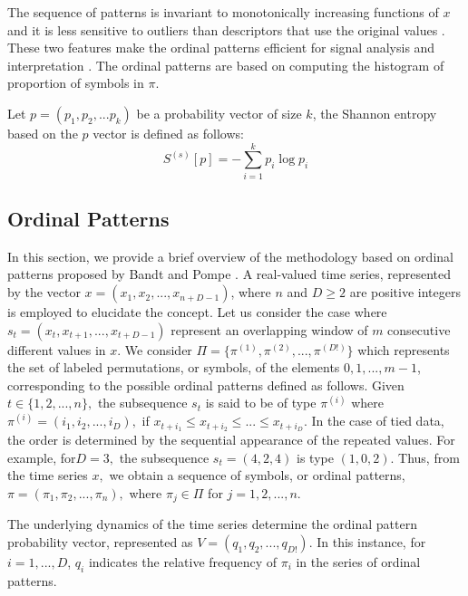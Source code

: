 \documentclass[sn-basic,pdflatex]{sn-jnl}
\theoremstyle{remark}
\theoremstyle{definition}
\begin{document}
The sequence of patterns is invariant to monotonically increasing
functions of \textbf{\(x\)} and it is less sensitive to outliers than
descriptors that use the original values \citep{chagas2022white}. These
two features make the ordinal patterns efficient for signal analysis and
interpretation \citep{amigo2023ordinal}. The ordinal patterns are based
on computing the histogram of proportion of symbols in \textbf{\(\pi\)}.

Let \(p=(p_1 ,p_2 ,... p_k)\) be a probability vector of size \(k\), the
Shannon entropy based on the \(p\) vector is defined as follows:
\begin{equation}
S^{(s)}[p]=-\sum_{i=1}^{k}{p_i \log p_i}
\end{equation}

\subsection{Ordinal Patterns}\label{ordinal-patterns}

In this section, we provide a brief overview of the methodology based on
ordinal patterns proposed by Bandt and Pompe
\citep{PhysRevLett.88.174102}. A real-valued time series, represented by
the vector \(x = (x_1, x_2, ..., x_{n+D-1})\), where \(n\) and
\(D\ge 2\) are positive integers is employed to elucidate the concept.
Let us consider the case where \(s_t=(x_t, x_{t+1}, ..., x_{t+D-1})\)
represent an overlapping window of \(m\) consecutive different values in
\(x\). We consider \(\Pi=\{\pi^{(1)}, \pi^{(2)}, ..., \pi^{(D!)}\}\)
which represents the set of labeled permutations, or symbols, of the
elements \(0,1,...,m-1\), corresponding to the possible ordinal patterns
defined as follows. Given \(t \in \{1,2,...,n\},\) the subsequence
\(s_t\) is said to be of type \(\pi^{(i)}\) where
\(\pi^{(i)}=(i_1, i_2, ..., i_D),\) if
\(x_{t+i_1}\le x_{t+i_2} \le ...\le x_{t+i_D}.\) In the case of tied
data, the order is determined by the sequential appearance of the
repeated values. For example, for\(D=3,\) the subsequence
\(s_t=(4,2,4)\) is type \((1,0,2)\). Thus, from the time series \(x,\)
we obtain a sequence of symbols, or ordinal patterns,
\(\pi=(\pi_1, \pi_2, ..., \pi_n),\) where \(\pi_j \in \Pi\) for
\(j=1,2,...,n.\)

The underlying dynamics of the time series determine the ordinal pattern
probability vector, represented as \(V = (q_1,q_2, ..., q_{D!}).\) In
this instance, for \(i=1,...,D\), \(q_i\) indicates the relative
frequency of \(\pi_i\) in the series of ordinal patterns.
\end{document}
